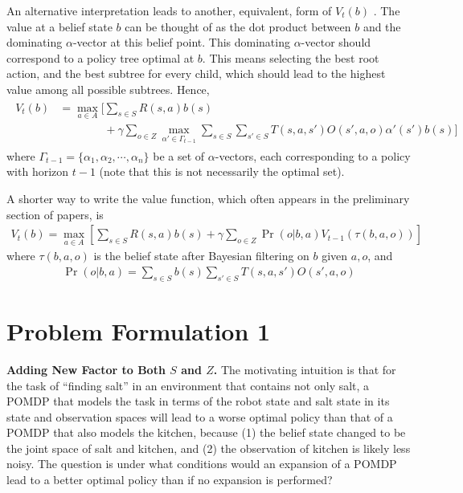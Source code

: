 \documentclass{article}
\begin{document}
An alternative interpretation leads to another, equivalent, form of $V_t(b)$ \cite{pineau2003point}. The value at a belief state $b$ can be thought of as the dot product between $b$ and the dominating $\alpha$-vector at this belief point. This dominating $\alpha$-vector should correspond to a policy tree optimal at $b$. This means selecting the best root action, and the best subtree for every child, which should lead to the highest value among all possible subtrees. Hence,
\begin{align}
\begin{split}
V_t(b) &= \max_{a\in A} \Bigg[ \sum_{s\in S} R(s,a)b(s)\\
&\qquad\qquad+ \gamma \sum_{o\in Z} \max_{\alpha'\in \Gamma_{t-1}} \sum_{s\in S} \sum_{s'\in S} T(s,a,s')O(s',a,o)\alpha'(s')b(s)  \Bigg]
\end{split}
\end{align}
where $\Gamma_{t-1}=\{\alpha_1,\alpha_2,\cdots,\alpha_n\}$ be a set of $\alpha$-vectors, each corresponding to a policy with horizon $t-1$ (note that this is not necessarily the optimal set).

A shorter way to write the value function, which often appears in the preliminary section of papers, is \cite{lee2007makes}
\begin{align}
V_t(b) = \max_{a\in A}\left[ \sum_{s\in S} R(s,a)b(s) + \gamma \sum_{o\in Z} \Pr(o | b,a) V_{t-1}(\tau(b,a,o))   \right]
\end{align}
where $\tau(b,a,o)$ is the belief state after Bayesian filtering on $b$ given $a,o$, and
\begin{align}
\Pr(o | b,a) = \sum_{s\in S}b(s)\sum_{s'\in S}T(s,a,s')O(s',a,o)
\end{align}






\section{Problem Formulation 1}

\textbf{Adding New Factor to Both $S$ and $Z$.}
The motivating intuition is that for the task of ``finding salt'' in an environment that contains not only salt, a POMDP that models the task in terms of the robot state and salt state in its state and observation spaces will lead to a worse optimal policy than that of a POMDP that also models the kitchen, because (1) the belief state changed to be the joint space of salt and kitchen, and (2) the observation of kitchen is likely less noisy.  The question is under what conditions would an expansion of a POMDP lead to a better optimal policy than if no expansion is performed?
\end{document}
